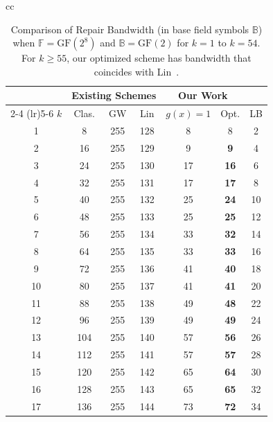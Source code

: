 \documentclass[onecolumn]{IEEEtran}
\theoremstyle{plain}
\theoremstyle{definition}
\newcommand{\FF}{\mathbb{F}}
\newcommand{\BB}{\mathbb{B}}
\newcommand{\GF}{{\mathrm{GF}}}
\begin{document}
\begin{table}[h!]
    \centering
    \small
    \caption{Comparison of Repair Bandwidth (in base field symbols $\BB$) when $\FF = \GF(2^8)$ and $\BB = \GF(2)$ for $k=1$ to $k=54$. For $k\ge 55$, our optimized scheme has bandwidth that coincides with Lin~\cite{Lin2023}.}
    \label{tab:bandwidth_comparison}
    
    \begin{tabular}{cc}
        \begin{tabular}[t]{c c c c c c c}
            \toprule
             & \multicolumn{3}{c}{\textbf{Existing Schemes}} & \multicolumn{2}{c}{\textbf{Our Work}} & \\
            \cmidrule(lr){2-4} \cmidrule(lr){5-6}
            $k$ & Clas. & GW & Lin & $g(x)=1$ & Opt. & LB \\
            \midrule
            1 & 8 & 255 & 128 & 8 & 8 & 2 \\
            2 & 16 & 255 & 129 & 9 & \textbf{9} & 4 \\
            3 & 24 & 255 & 130 & 17 & \textbf{16} & 6 \\
            4 & 32 & 255 & 131 & 17 & \textbf{17} & 8 \\
            5 & 40 & 255 & 132 & 25 & \textbf{24} & 10 \\
            6 & 48 & 255 & 133 & 25 & \textbf{25} & 12 \\
            7 & 56 & 255 & 134 & 33 & \textbf{32} & 14 \\
            8 & 64 & 255 & 135 & 33 & \textbf{33} & 16 \\
            9 & 72 & 255 & 136 & 41 & \textbf{40} & 18 \\
            10 & 80 & 255 & 137 & 41 & \textbf{41} & 20 \\
            11 & 88 & 255 & 138 & 49 & \textbf{48} & 22 \\
            12 & 96 & 255 & 139 & 49 & \textbf{49} & 24 \\
            13 & 104 & 255 & 140 & 57 & \textbf{56} & 26 \\
            14 & 112 & 255 & 141 & 57 & \textbf{57} & 28 \\
            15 & 120 & 255 & 142 & 65 & \textbf{64} & 30 \\
            16 & 128 & 255 & 143 & 65 & \textbf{65} & 32 \\
            17 & 136 & 255 & 144 & 73 & \textbf{72} & 34 \\

\end{tabular}
\end{tabular}
\end{table}
\end{document}
